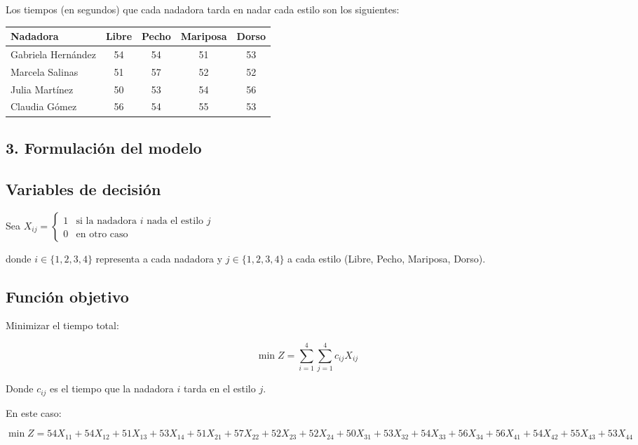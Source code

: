 \documentclass[12pt, a4paper, oneside]{book}
\theoremstyle{definition}
\begin{document}
Los tiempos (en segundos) que cada nadadora tarda en nadar cada estilo son los siguientes:

\begin{center}
\begin{tabular}{lcccc}
\toprule
\textbf{Nadadora} & \textbf{Libre} & \textbf{Pecho} & \textbf{Mariposa} & \textbf{Dorso} \\
\midrule
Gabriela Hernández & 54 & 54 & 51 & 53 \\
Marcela Salinas     & 51 & 57 & 52 & 52 \\
Julia Martínez      & 50 & 53 & 54 & 56 \\
Claudia Gómez       & 56 & 54 & 55 & 53 \\
\bottomrule
\end{tabular}
\end{center}

\subsection{3. Formulación del modelo}

\subsection{Variables de decisión}

Sea $X_{ij} = 
\begin{cases}
1 & \text{si la nadadora } i \text{ nada el estilo } j \\
0 & \text{en otro caso}
\end{cases}$

donde \( i \in \{1,2,3,4\} \) representa a cada nadadora y \( j \in \{1,2,3,4\} \) a cada estilo (Libre, Pecho, Mariposa, Dorso).

\subsection{Función objetivo}

Minimizar el tiempo total:

\[
\min Z = \sum_{i=1}^{4} \sum_{j=1}^{4} c_{ij} X_{ij}
\]

Donde \( c_{ij} \) es el tiempo que la nadadora \( i \) tarda en el estilo \( j \).

En este caso:

\[
\min Z = 54X_{11} + 54X_{12} + 51X_{13} + 53X_{14} + 
51X_{21} + 57X_{22} + 52X_{23} + 52X_{24} +
50X_{31} + 53X_{32} + 54X_{33} + 56X_{34} +
56X_{41} + 54X_{42} + 55X_{43} + 53X_{44}
\]
\end{document}
